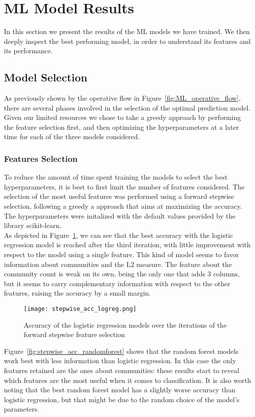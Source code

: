 \section{ML Model Results}\label{sec:results_ML}
In this section we present the results of the ML models we have trained. We then deeply inspect the best performing model,
in order to understand its features and its performance.



\subsection{Model Selection}\label{subsec:results_ML_model_selection}
As previously shown by the operative flow in Figure~\ref{fig:ML_operative_flow}, there are several phases involved in the
selection of the optimal prediction model. Given our limited resources we chose to take a greedy approach by performing
the feature selection first, and then optimizing the hyperparameters at a later time for each of the three models considered.
\subsubsection*{Features Selection}
To reduce the amount of time spent training the models to select the best hyperparameters, it is best to first limit the
number of features considered. The selection of the most useful features was performed using a forward stepwise selection,
following a greedy a approach that aims at maximizing the accuracy. The hyperparameters were initalized with the default
values provided by the library scikit-learn.\\
As depicted in Figure~\ref{fig:stepwise_acc_logreg}, we can see that the best accuracy with the logistic regression
model is reached after the third iteration, with little improvement with respect to the model using a single feature.
This kind of model seems to favor information about communities and the L2 measure. The feature about the community count is weak on its own,
being the only one that adds 3 columns, but it seems to carry complementary information with respect to the other features,
raising the accuracy by a small margin.
\begin{figure}[h]
	\centering
	\texttt{[image: stepwise\_acc\_logreg.png]}
	\caption{Accuracy of the logistic regression models over the iterations of the forward stepwise feature selection}\label{fig:stepwise_acc_logreg}
\end{figure}
\noindent
Figure~\ref{fig:stepwise_acc_randomforest} shows that the random forest models work best with less information than logistic regression.
In this case the only features retained are the ones about communities: these results start to reveal which features are the most useful
when it comes to classification.
It is also worth noting that the best random forest model has a slightly worse accuracy than logistic regression,
but that might be due to the random choice of the model's parameters.


